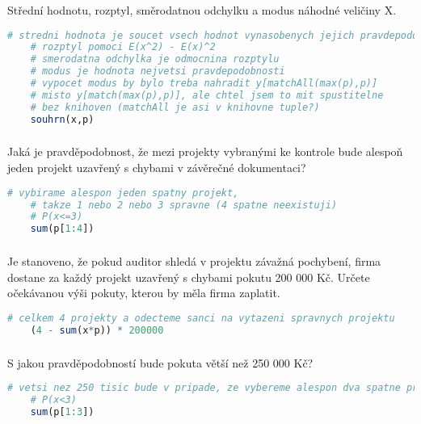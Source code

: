 \documentclass{article}%
\begin{document}
\subsubsection{}
Střední hodnotu, rozptyl, směrodatnou odchylku a modus náhodné veličiny X. 
\begin{lstlisting}[language=R, showstringspaces=false, basicstyle=\small]
    # stredni hodnota je soucet vsech hodnot vynasobenych jejich pravdepodobnosti
    # rozptyl pomoci E(x^2) - E(x)^2
    # smerodatna odchylka je odmocnina rozptylu
    # modus je hodnota nejvetsi pravdepodobnosti
    # vypocet modus by bylo treba nahradit y[matchAll(max(p),p)] 
    # misto y[match(max(p),p)], ale chtel jsem to mit spustitelne 
    # bez knihoven (matchAll je asi v knihovne tuple?)
    souhrn(x,p)
\end{lstlisting}

\subsubsection{}
Jaká je pravděpodobnost, že mezi projekty vybranými ke kontrole bude alespoň jeden projekt uzavřený s chybami v závěrečné dokumentaci? 
\begin{lstlisting}[language=R, showstringspaces=false, basicstyle=\small]
    # vybirame alespon jeden spatny projekt, 
    # takze 1 nebo 2 nebo 3 spravne (4 spatne neexistuji)
    # P(x<=3)
    sum(p[1:4])
\end{lstlisting}

\subsubsection{}
Je stanoveno, že pokud auditor shledá v projektu závažná pochybení, firma dostane za každý projekt uzavřený s chybami pokutu 200 000 Kč.
Určete očekávanou výši pokuty, kterou by měla firma zaplatit. 
\begin{lstlisting}[language=R, showstringspaces=false, basicstyle=\small]
    # celkem 4 projekty a odecteme sanci na vytazeni spravnych projektu
    (4 - sum(x*p)) * 200000 
\end{lstlisting}

\subsubsection{}
S jakou pravděpodobností bude pokuta větší než 250 000 Kč? 
\begin{lstlisting}[language=R, showstringspaces=false, basicstyle=\small]
    # vetsi nez 250 tisic bude v pripade, ze vybereme alespon dva spatne projekty
    # P(x<3)
    sum(p[1:3])
\end{lstlisting}
\end{document}
